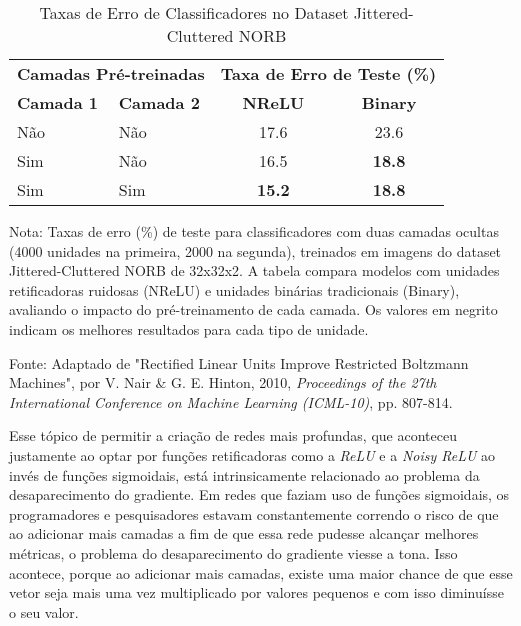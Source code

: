 \begin{table}[ht]
    \centering
    \begin{threeparttable}
        \caption{Taxas de Erro de Classificadores no Dataset Jittered-Cluttered NORB}
        \label{tab:nrelu-norb-comparativo}
        \begin{tabular}{llcc}
            \toprule
            \multicolumn{2}{c}{\textbf{Camadas Pré-treinadas}} & \multicolumn{2}{c}{\textbf{Taxa de Erro de Teste (\%)}} \\
            \cmidrule(r){1-2} \cmidrule(r){3-4} %
            \textbf{Camada 1} & \textbf{Camada 2} & \textbf{NReLU} & \textbf{Binary} \\
            \midrule
            
            Não & Não & 17.6 & 23.6 \\
            Sim & Não & 16.5 & \textbf{18.8} \\
            Sim & Sim & \textbf{15.2} & \textbf{18.8} \\
            
            \bottomrule
        \end{tabular}
        
        \begin{tablenotes}[para]
            \small
            \item[] Nota: Taxas de erro (\%) de teste para classificadores com duas camadas ocultas (4000 unidades na primeira, 2000 na segunda), treinados em imagens do dataset Jittered-Cluttered NORB de 32x32x2. A tabela compara modelos com unidades retificadoras ruidosas (NReLU) e unidades binárias tradicionais (Binary), avaliando o impacto do pré-treinamento de cada camada. Os valores em negrito indicam os melhores resultados para cada tipo de unidade.
            \item[] Fonte: Adaptado de "Rectified Linear Units Improve Restricted Boltzmann Machines", por V. Nair \& G. E. Hinton, 2010, \textit{Proceedings of the 27th International Conference on Machine Learning (ICML-10)}, pp. 807-814.
        \end{tablenotes}
        
    \end{threeparttable}
\end{table}

Esse tópico de permitir a criação de redes mais profundas, que aconteceu justamente ao optar por funções retificadoras como a \textit{ReLU} e a \textit{Noisy ReLU} ao invés de funções sigmoidais, está intrinsicamente relacionado ao problema da desaparecimento do gradiente. Em redes que faziam uso de funções sigmoidais, os programadores e pesquisadores estavam constantemente correndo o risco de que ao adicionar mais camadas a fim de que essa rede pudesse alcançar melhores métricas, o problema do desaparecimento do gradiente viesse a tona. Isso acontece, porque ao adicionar mais camadas, existe uma maior chance de que esse vetor seja mais uma vez multiplicado por valores pequenos e com isso diminuísse o seu valor.

